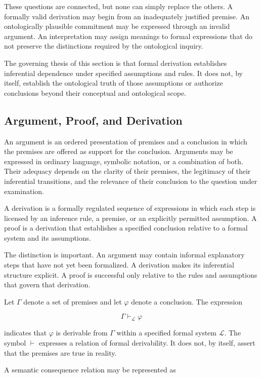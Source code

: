 These questions are connected, but none can simply replace the
others. A formally valid derivation may begin from an inadequately
justified premise. An ontologically plausible commitment may be
expressed through an invalid argument. An interpretation may assign
meanings to formal expressions that do not preserve the distinctions
required by the ontological inquiry.

The governing thesis of this section is that formal derivation
establishes inferential dependence under specified assumptions and
rules. It does not, by itself, establish the ontological truth of
those assumptions or authorize conclusions beyond their conceptual
and ontological scope.

\subsection{Argument, Proof, and Derivation}

An argument is an ordered presentation of premises and a conclusion
in which the premises are offered as support for the conclusion.
Arguments may be expressed in ordinary language, symbolic notation,
or a combination of both. Their adequacy depends on the clarity of
their premises, the legitimacy of their inferential transitions,
and the relevance of their conclusion to the question under
examination.

A derivation is a formally regulated sequence of expressions in
which each step is licensed by an inference rule, a premise, or an
explicitly permitted assumption. A proof is a derivation that
establishes a specified conclusion relative to a formal system and
its assumptions.

The distinction is important. An argument may contain informal
explanatory steps that have not yet been formalized. A derivation
makes its inferential structure explicit. A proof is successful
only relative to the rules and assumptions that govern that
derivation.

Let \(\Gamma\) denote a set of premises and let \(\varphi\) denote
a conclusion. The expression

\[
    \Gamma \vdash_{\mathcal{L}} \varphi
\]

indicates that \(\varphi\) is derivable from \(\Gamma\) within a
specified formal system \(\mathcal{L}\). The symbol \(\vdash\)
expresses a relation of formal derivability. It does not, by itself,
assert that the premises are true in reality.

A semantic consequence relation may be represented as

